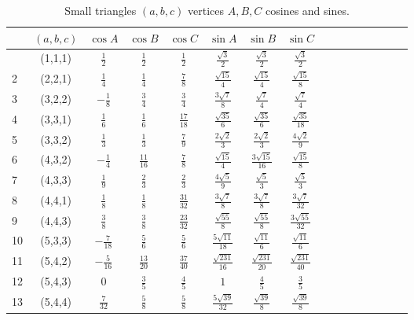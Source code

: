 \documentclass[11pt]{article}
\begin{document}
\begin{longtable}{ | p{1cm}| *{15}{c|} }
\caption{Small triangles $(a,b,c)$ vertices $A,B,C$ cosines and sines.}\\
\hline
  & $(a,b,c)$ & $\cos{A}$ & $\cos{B}$ & $\cos{C}$ & $\sin{A}$ & $\sin{B}$ & $\sin{C}$\\
\hline\endhead
\hline\endfoot
1 & (1,1,1) & $\frac{1}{2}$ & $\frac{1}{2}$ & $\frac{1}{2}$ & $\frac{\sqrt{3}}{2}$ & $\frac{\sqrt{3}}{2}$ & $\frac{\sqrt{3}}{2}$\\
2 & (2,2,1) & $\frac{1}{4}$ & $\frac{1}{4}$ & $\frac{7}{8}$ & $\frac{\sqrt{15}}{4}$ & $\frac{\sqrt{15}}{4}$ & $\frac{\sqrt{15}}{8}$\\
3 & (3,2,2) & $-\frac{1}{8}$ & $\frac{3}{4}$ & $\frac{3}{4}$ & $\frac{3\sqrt{7}}{8}$ & $\frac{\sqrt{7}}{4}$ & $\frac{\sqrt{7}}{4}$\\
4 & (3,3,1) & $\frac{1}{6}$ & $\frac{1}{6}$ & $\frac{17}{18}$ & $\frac{\sqrt{35}}{6}$ & $\frac{\sqrt{35}}{6}$ & $\frac{\sqrt{35}}{18}$\\
5 & (3,3,2) & $\frac{1}{3}$ & $\frac{1}{3}$ & $\frac{7}{9}$ & $\frac{2\sqrt{2}}{3}$ & $\frac{2\sqrt{2}}{3}$ & $\frac{4\sqrt{2}}{9}$\\
6 & (4,3,2) & $-\frac{1}{4}$ & $\frac{11}{16}$ & $\frac{7}{8}$ & $\frac{\sqrt{15}}{4}$ & $\frac{3\sqrt{15}}{16}$ & $\frac{\sqrt{15}}{8}$\\
7 & (4,3,3) & $\frac{1}{9}$ & $\frac{2}{3}$ & $\frac{2}{3}$ & $\frac{4\sqrt{5}}{9}$ & $\frac{\sqrt{5}}{3}$ & $\frac{\sqrt{5}}{3}$\\
8 & (4,4,1) & $\frac{1}{8}$ & $\frac{1}{8}$ & $\frac{31}{32}$ & $\frac{3\sqrt{7}}{8}$ & $\frac{3\sqrt{7}}{8}$ & $\frac{3\sqrt{7}}{32}$\\
9 & (4,4,3) & $\frac{3}{8}$ & $\frac{3}{8}$ & $\frac{23}{32}$ & $\frac{\sqrt{55}}{8}$ & $\frac{\sqrt{55}}{8}$ & $\frac{3\sqrt{55}}{32}$\\
10 & (5,3,3) & $-\frac{7}{18}$ & $\frac{5}{6}$ & $\frac{5}{6}$ & $\frac{5\sqrt{11}}{18}$ & $\frac{\sqrt{11}}{6}$ & $\frac{\sqrt{11}}{6}$\\
11 & (5,4,2) & $-\frac{5}{16}$ & $\frac{13}{20}$ & $\frac{37}{40}$ & $\frac{\sqrt{231}}{16}$ & $\frac{\sqrt{231}}{20}$ & $\frac{\sqrt{231}}{40}$\\
12 & (5,4,3) & $0$ & $\frac{3}{5}$ & $\frac{4}{5}$ & $1$ & $\frac{4}{5}$ & $\frac{3}{5}$\\
13 & (5,4,4) & $\frac{7}{32}$ & $\frac{5}{8}$ & $\frac{5}{8}$ & $\frac{5\sqrt{39}}{32}$ & $\frac{\sqrt{39}}{8}$ & $\frac{\sqrt{39}}{8}$\\

\end{longtable}
\end{document}

